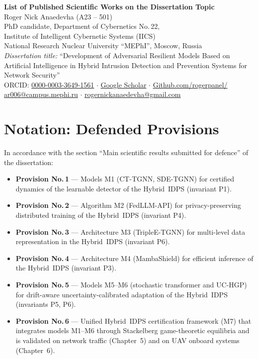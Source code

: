 \documentclass[11pt,a4paper]{article}
\begin{document}
\begin{center}
{\LARGE \textbf{List of Published Scientific Works on the Dissertation Topic}}\\[0.4em]
{\large Roger Nick Anaedevha (A23 -- 501)}\\[0.3em]
PhD candidate, Department of Cybernetics No.\,22, \\ Institute of Intelligent Cybernetic Systems (IICS)\\
National Research Nuclear University ``MEPhI'', Moscow, Russia\\[0.3em]
\textit{Dissertation title:} ``Development of Adversarial Resilient Models Based on Artificial Intelligence in Hybrid Intrusion Detection and Prevention Systems for Network Security''\\[0.3em]
ORCID: \href{https://orcid.org/0000-0003-3649-1561}{0000-0003-3649-1561} ${\cdot}$
\href{https://scholar.google.com/citations?user=w6ryqsEAAAAJ&hl=en}{Google Scholar} ${\cdot}$
\href{https://github.com/rogerpanel/}{Github.com/rogerpanel/}\\
\href{mailto:ar006@campus.mephi.ru}{ar006@campus.mephi.ru} ${\cdot}$ \href{mailto:rogernickanaedevha@gmail.com}{rogernickanaedevha@gmail.com}
\end{center}

\vspace{-0.4cm}

\section*{Notation: Defended Provisions}

In accordance with the section ``Main scientific results submitted for defence'' of the dissertation:

\begin{itemize}[leftmargin=2em, itemsep=0.1em]
  \item \textbf{Provision No.\,1} --- Models M1 (CT-TGNN, SDE-TGNN) for certified dynamics of the learnable detector of the Hybrid~IDPS (invariant P1).
  \item \textbf{Provision No.\,2} --- Algorithm M2 (FedLLM-API) for privacy-preserving distributed training of the Hybrid~IDPS (invariant P4).
  \item \textbf{Provision No.\,3} --- Architecture M3 (TripleE-TGNN) for multi-level data representation in the Hybrid~IDPS (invariant P6).
  \item \textbf{Provision No.\,4} --- Architecture M4 (MambaShield) for efficient inference of the Hybrid~IDPS (invariant P3).
  \item \textbf{Provision No.\,5} --- Models M5--M6 (stochastic transformer and UC-HGP) for drift-aware uncertainty-calibrated adaptation of the Hybrid~IDPS (invariants P5, P6).
  \item \textbf{Provision No.\,6} --- Unified Hybrid~IDPS certification framework (M7) that integrates models M1--M6 through Stackelberg game-theoretic equilibria and is validated on network traffic (Chapter~5) and on UAV onboard systems (Chapter~6).
\end{itemize}
\end{document}
